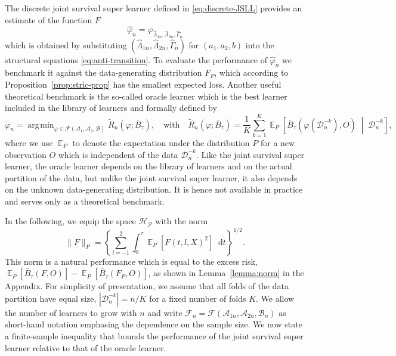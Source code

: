 \documentclass[lineno]{biometrika}
\DeclareMathOperator{\E}{\mathbb{E}} %
\renewcommand{\phi}{\varphi}
\newcommand*\diff{\mathop{}\!\mathrm{d}}
\newcommand{\midd}{\; \middle|\;}
\newcommand{\1}{\mathds{1}}
\DeclareMathOperator*{\argmin}{\arg\!\min}
\newcommand{\data}{\ensuremath{\mathcal{D}}}
\begin{document}
The discrete joint survival super learner defined in
\eqref{eq:discrete-JSLL} provides an estimate of the function \(F\)
\begin{equation*}
  \hat{\phi}_n=\phi_{\hat \Lambda_{1n},\hat \Lambda_{2n}, \hat \Gamma_{n}}
\end{equation*} which is obtained by substituting \((\hat
\Lambda_{1n},\hat \Lambda_{2n}, \hat \Gamma_{n})\) for \((a_1,a_2,b)\) into the structural
equations \eqref{eq:anti-transition}. To evaluate the performance of
\(\hat{\phi}_n\) we benchmark it against the data-generating
distribution \( F_P \), which according to
Proposition~\ref{prop:stric-prop} has the smallest expected
loss. Another useful theoretical benchmark is the so-called oracle
learner which is the best learner included in the library of learners
and formally defined by
\begin{equation*}
  \tilde{\phi}_n
  =  \argmin_{\phi \in \mathcal{F}(\mathcal{A}_1, \mathcal{A}_2, \mathcal{B}) }
  \tilde{R}_{n}(\phi ; \bar{B}_{\tau}),
  \quad \text{with} \quad 
  \tilde{R}_n(\phi; \bar{B}_{\tau})=
  \frac{1}{K}\sum_{k=1}^{K} 
  \E_P{
    \left[
      \bar{B}_{\tau}
      {
        \left(
          \phi{ (\data_n^{-k})}
          , O
        \right)
      } 
      \midd  \data_n^{-k}
    \right]}
  ,
\end{equation*}
where we use \( \E_P \) to denote the expectation
under the distribution \( P \) for a new observation \( O \) which is
independent of the data \( \data_n^{-k} \). Like the joint survival
super learner, the oracle learner depends on the library of learners
and on the actual partition of the data, but unlike the joint survival
super learner, it also depends on the unknown data-generating
distribution. It is hence not available in practice and serves only as
a theoretical benchmark.

In the following, we equip the space \( \mathcal{H}_{\mathcal{P}} \)
with the norm
\begin{equation}
  \label{eq:norm}
  \| F \|_{P} = 
  \left\{
    \sum_{l=-1}^{2}
    \int_0^{\tau} \E_P{\left[ F(t, l, X)^2 \right]} \diff t
  \right\}^{1/2}.
\end{equation} This norm is a natural performance which is equal to
the excess risk, \( \E_P{[\bar{B}_\tau(F, O)]} -
\E_P{[\bar{B}_\tau(F_P, O)]} \), as shown in Lemma~\ref{lemma:norm} in
the Appendix. For simplicity of presentation, we assume that all folds
of the data partition have equal size, \( |\data_n^{-k}| = n/K \) for
a fixed number of folds \( K \). We allow the number of learners
to grow with \( n \) and write \(
\mathcal{F}_n=\mathcal{F}(\mathcal{A}_{1n}, \mathcal{A}_{2n},
\mathcal{B}_n)\) as short-hand notation emphasing the dependence on
the sample size. We now state a finite-sample inequality that bounds
the performance of the joint survival super learner relative to that
of the oracle learner.
\end{document}
